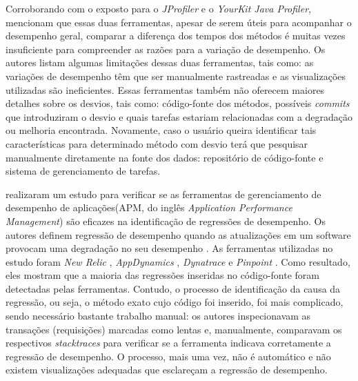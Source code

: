 Corroborando com o exposto para o \textit{JProfiler} e o \textit{YourKit Java Profiler}, \citeauthor{SandovalAlcocer2013} mencionam que essas duas ferramentas, apesar de serem úteis para acompanhar o desempenho geral, comparar a diferença dos tempos dos métodos é muitas vezes insuficiente para compreender as razões para a variação de desempenho. Os autores listam algumas limitações dessas duas ferramentas, tais como: as variações de desempenho têm que ser manualmente rastreadas e as visualizações utilizadas são ineficientes. Essas ferramentas também não oferecem maiores detalhes sobre os desvios, tais como: código-fonte dos métodos, possíveis \textit{commits} que introduziram o desvio e quais tarefas estariam relacionadas com a degradação ou melhoria encontrada. Novamente, caso o usuário queira identificar tais características para determinado método com desvio terá que pesquisar manualmente diretamente na fonte dos dados: repositório de código-fonte e sistema de gerenciamento de tarefas.

\citeauthor{Ahmed2016} realizaram um estudo para verificar se as ferramentas de gerenciamento de desempenho de aplicações(APM, do inglês \textit{Application Performance Management}) são eficazes na identificação de regressões de desempenho. Os autores definem regressão de desempenho quando as atualizações em um software provocam uma degradação no seu desempenho \cite{Ahmed2016}. As ferramentas utilizadas no estudo foram \textit{New Relic} \cite{Relic2016}, \textit{AppDynamics} \cite{Appdynamics}, \textit{Dynatrace} \cite{Dynatrace2016} e \textit{Pinpoint} \cite{Pinpoint2016}. Como resultado, eles mostram que a maioria das regressões inseridas no código-fonte foram detectadas pelas ferramentas. Contudo, o processo de identificação da causa da regressão, ou seja, o método exato cujo código foi inserido, foi mais complicado, sendo necessário bastante trabalho manual: os autores inspecionavam as transações (requisições) marcadas como lentas e, manualmente, comparavam os respectivos \textit{stacktraces} para verificar se a ferramenta indicava corretamente a regressão de desempenho. O processo, mais uma vez, não é automático e não existem visualizações adequadas que esclareçam a regressão de desempenho.

